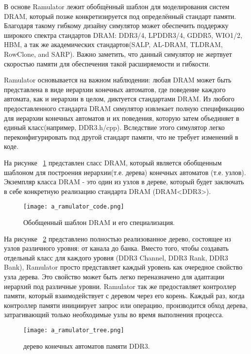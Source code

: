 В основе Ramulator лежит обобщённый шаблон для моделирования систем DRAM, который позже конкретизируется под определённый стандарт памяти. Благодаря такому гибкому дизайну симулятор может обеспечить поддержку широкого спектра стандартов DRAM: DDR3/4, LPDDR3/4, GDDR5, WIO1/2, HBM, а так же академических стандартов(SALP, AL-DRAM, TLDRAM, RowClone, and SARP).  Важно заметить, что данный симулятор не жертвует скоростью памяти для обеспечения такой расширяемости и гибкости. 

Ramulator основывается на важном наблюдении: любая DRAM может быть представлена в виде иерархии конечных автоматов, где поведение каждого автомата, как и иерархии в целом, диктуется стандартами DRAM.
Из любого предоставленного стандарта DRAM симулятор извлекает полную спецификацию для иерархии конечных автоматов и их поведения, которую затем объединяет в единый класс(например, DDR3.h/cpp). Вследствие этого симулятор легко переконфигурировать под другой стандарт памяти, что не требует изменений в коде.

На рисунке ~\ref{fig:domain:simulators:ramulator:code} представлен сласс DRAM, который является обобщенным шаблоном для построения иерархии(т.е. дерева) конечных автоматов (т.е. узлов). Экземпляр класса DRAM  - это один из узлов в дереве, который будет заключать в себе конкретную реализацию стандарта DRAM (DRAM<DDR3>).

\begin{figure}[ht]
\centering
  \texttt{[image: a\_ramulator\_code.png]}  
  \caption{ Обобщенный шаблон DRAM и его специализация. }
  \label{fig:domain:simulators:ramulator:code}
\end{figure}

На рисунке ~\ref{fig:domain:simulators:ramulator:tree} представлено полностью реализованное дерево, состоящее из узлов различного уровня: от канала до банка. Вместо того, чтобы создавать отдельный класс для каждого уровня (DDR3 Channel, DDR3 Rank, DDR3 Bank), Ramulator просто представляет каждый уровень как очередное свойство узла дерева. Это свойство может быть легко переназначено для адаптации иерархий под различные уровни. Ramulator так же предоставляет контроллер памяти, который взаимодействует с деревом через его корень. Каждый раз, когда контроллер памяти инициирует запрос или операцию, производится обход дерева, затрагивающий только необходимые узлы во время выполнения процесса.

\begin{figure}[ht]
\centering
  \texttt{[image: a\_ramulator\_tree.png]}  
  \caption{ дерево конечных автоматов памяти DDR3. }
  \label{fig:domain:simulators:ramulator:tree}
\end{figure}

